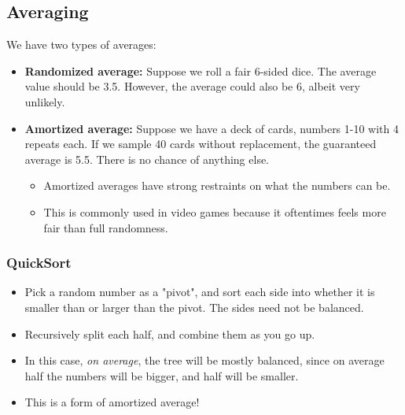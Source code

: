 \documentclass[10pt]{article}
\begin{document}
\subsection*{Averaging}
We have two types of averages:
\begin{itemize}
	\item \textbf{Randomized average:} Suppose we roll a fair 6-sided dice.  The average value should be 3.5.  However, the average could also be 6, albeit very unlikely.
	\item \textbf{Amortized average:} Suppose we have a deck of cards, numbers 1-10 with 4 repeats each.  If we sample 40 cards without replacement, the guaranteed average is 5.5.  There is no chance of anything else.
	\begin{itemize}
	    \item Amortized averages have strong restraints on what the numbers can be.
	    \item This is commonly used in video games because it oftentimes feels more fair than full randomness.
    \end{itemize}
\end{itemize}

\subsubsection*{QuickSort}
\begin{itemize}
	\item Pick a random number as a "pivot", and sort each side into whether it is smaller than or larger than the pivot.  The sides need not be balanced.
	\item Recursively split each half, and combine them as you go up.
    \item In this case, \textit{on average}, the tree will be mostly balanced, since on average half the numbers will be bigger, and half will be smaller.
    \item This is a form of amortized average!
\end{itemize}
\end{document}
